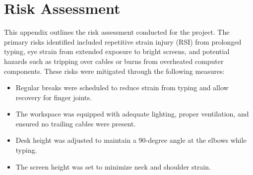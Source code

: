 \chapter{Risk Assessment}
This appendix outlines the risk assessment conducted for the project. The primary risks identified included repetitive strain injury (RSI) from prolonged typing, eye strain from extended exposure to bright screens, and potential hazards such as tripping over cables or burns from overheated computer components. These risks were mitigated through the following measures:

\begin{itemize}
    \item Regular breaks were scheduled to reduce strain from typing and allow recovery for finger joints.
    \item The workspace was equipped with adequate lighting, proper ventilation, and ensured no trailing cables were present.
    \item Desk height was adjusted to maintain a 90-degree angle at the elbows while typing.
    \item The screen height was set to minimize neck and shoulder strain.
\end{itemize}

